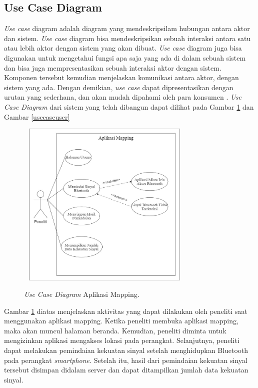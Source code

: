 \subsection{Use Case Diagram}
\textit{Use case} diagram adalah diagram yang mendeskripsilam hubungan antara aktor dan sistem. \textit{Use case} diagram bisa mendeskripsikan sebuah interaksi antara satu atau lebih aktor dengan sistem yang akan dibuat. \textit{Use case} diagram juga bisa digunakan untuk mengetahui fungsi apa saja yang ada di dalam sebuah sistem dan  bisa juga mempresentasikan sebuah interaksi aktor dengan sistem. Komponen tersebut kemudian menjelaskan komunikasi antara aktor,  dengan sistem yang ada. Dengan demikian, \textit{use case} dapat dipresentasikan dengan urutan yang sederhana, dan akan mudah dipahami oleh para konsumen \citep{Yu2009}. \textit{Use Case Diagram} dari sistem yang telah dibangun dapat dilihat pada Gambar \ref{usecasemapping} dan Gambar \ref{usecaseuser}

\begin{figure}[H]
	\center
	\shadowbox
	{\includegraphics [width=8.5cm, height=8cm]{gambar/mapping}}
	\caption{\textit{Use Case Diagram} Aplikasi Mapping.}
	\label{usecasemapping}
\end{figure}

\par Gambar \ref{usecasemapping} diatas menjelaskan aktivitas yang dapat dilakukan oleh peneliti saat menggunakan aplikasi mapping. Ketika peneliti membuka aplikasi mapping, maka akan muncul halaman beranda. Kemudian, peneliti diminta untuk mengizinkan aplikasi mengakses lokasi pada perangkat. Selanjutnya, peneliti dapat melakukan pemindaian kekuatan sinyal setelah menghidupkan Bluetooth pada perangkat \textit{smartphone}. Setelah itu, hasil dari pemindaian kekuatan sinyal tersebut disimpan didalam server dan dapat ditampilkan jumlah data kekuatan sinyal.
\fancyhf{}
\fancyfoot[R]{\thepage}

